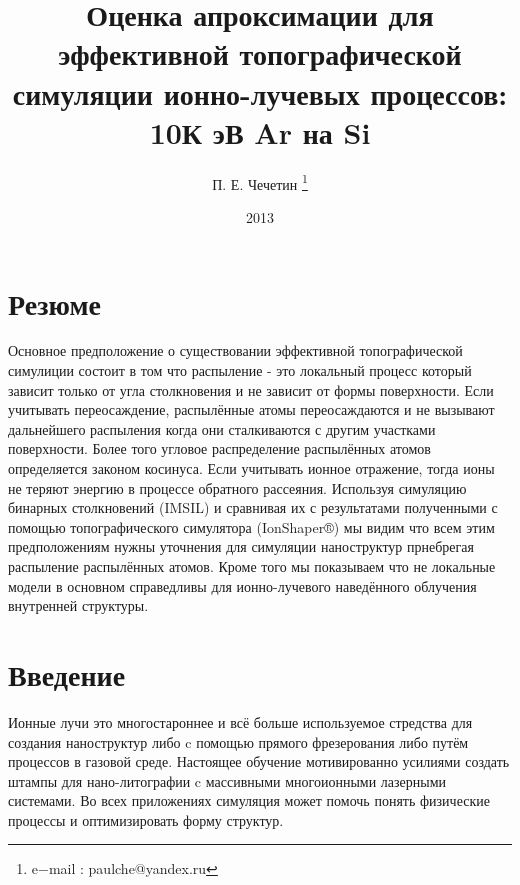 \documentclass[a4paper,fontsize=12pt]{article}
\begin{document}

%

\begin{titlepage}
  \title{Оценка апроксимации для эффективной топографической симуляции ионно-лучевых процессов: 10К эВ Ar на Si}
  \author{П. Е. Чечетин \thanks{e−mail : paulche@yandex.ru }} \date{2013}
  \maketitle
\end{titlepage}

\section{Резюме}
Основное предположение о существовании эффективной топографической симулиции состоит в том что распыление - это локальный процесс который зависит только от угла столкновения и не зависит от формы поверхности. Если учитывать переосаждение, распылённые атомы переосаждаются и не вызывают дальнейшего распыления когда они сталкиваются с другим участками поверхности. Более того угловое распределение распылённых атомов определяется законом косинуса. Если учитывать ионное отражение, тогда ионы не теряют энергию в процессе обратного рассеяния. Используя симуляцию бинарных столкновений (IMSIL) и сравнивая их с результатами полученными с помощью топографического симулятора (IonShaper®) мы видим что всем этим предположениям нужны уточнения для симуляции наноструктур прнебрегая распыление распылённых атомов. Кроме того мы показываем что не локальные модели в основном справедливы для ионно-лучевого наведённого облучения внутренней структуры.

\section{Введение}
Ионные лучи это многостароннее и всё больше используемое стредства для создания наноструктур либо c помощью прямого фрезерования либо путём процессов в газовой среде. Настоящее обучение мотивированно усилиями создать штампы для нано-литографии c массивными многоионными лазерными системами. Во всех приложениях симуляция может помочь понять физические процессы и оптимизировать форму структур.
\end{document}

